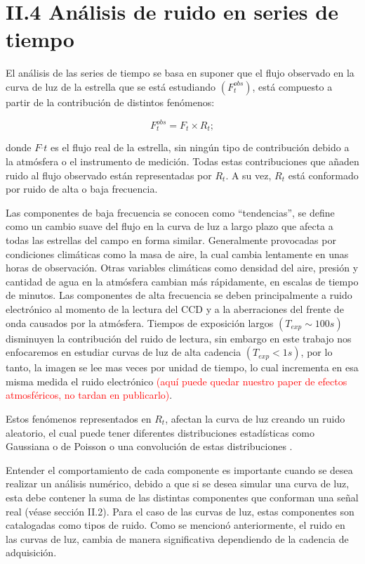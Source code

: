\section*{II.4 Análisis de ruido en series de tiempo}

El análisis de las series de tiempo se basa en suponer que el flujo observado en la curva de luz de la estrella que se está estudiando $(F^{obs}_{t})$, está  compuesto a partir de la contribución de distintos fenómenos:

\begin{equation}
  \displaystyle F^{obs}_{t}=F_{t}\times R_{t};
\end{equation}

\noindent donde $F^\_{t}$ es el flujo real de la estrella, sin ningún tipo de contribución debido a la atmósfera o el instrumento de medición. Todas estas contribuciones que añaden ruido al flujo observado están representadas por $R_{t}$. A su vez, $R_{t}$ está conformado por ruido de alta o baja frecuencia. 

Las componentes de baja frecuencia se conocen como ``tendencias'', se define como un cambio suave del flujo en la curva de luz a largo plazo que afecta a todas las estrellas del campo en forma similar. Generalmente provocadas por condiciones climáticas como la masa de aire, la cual cambia lentamente en unas horas de observación. Otras variables climáticas como densidad del aire, presión y cantidad de agua en la atmósfera cambian más rápidamente, en escalas de tiempo de minutos. Las componentes de alta frecuencia se deben principalmente a ruido electrónico al momento de la lectura del CCD y a la aberraciones del frente de onda causados por la atm\'osfera. Tiempos de exposición largos $(T_{exp} \sim 100 s)$ disminuyen la contribución del ruido de lectura, sin embargo en este trabajo nos enfocaremos en estudiar curvas de luz de alta cadencia $(T_{exp} < 1 s)$, por lo tanto, la imagen se lee mas veces por unidad de tiempo, lo cual incrementa en esa misma medida el ruido electr\'onico \textcolor{red}{(aquí puede quedar nuestro paper de efectos atmosféricos, no tardan en publicarlo)}.

Estos fenómenos representados en $R_{t}$, afectan la curva de luz creando un ruido aleatorio, el cual puede tener diferentes distribuciones estadísticas como Gaussiana o de Poisson o una convolución de estas distribuciones \cite{luisier2010image}.

Entender el comportamiento de cada componente es importante cuando se desea realizar un análisis numérico, debido a que si se desea simular una curva de luz, esta debe contener la suma de las distintas componentes que conforman una señal real (véase sección II.2). Para el caso de las curvas de luz, estas componentes son catalogadas como tipos de ruido. Como se mencionó anteriormente, el ruido en las curvas de luz, cambia de manera significativa dependiendo de la cadencia de adquisición.

